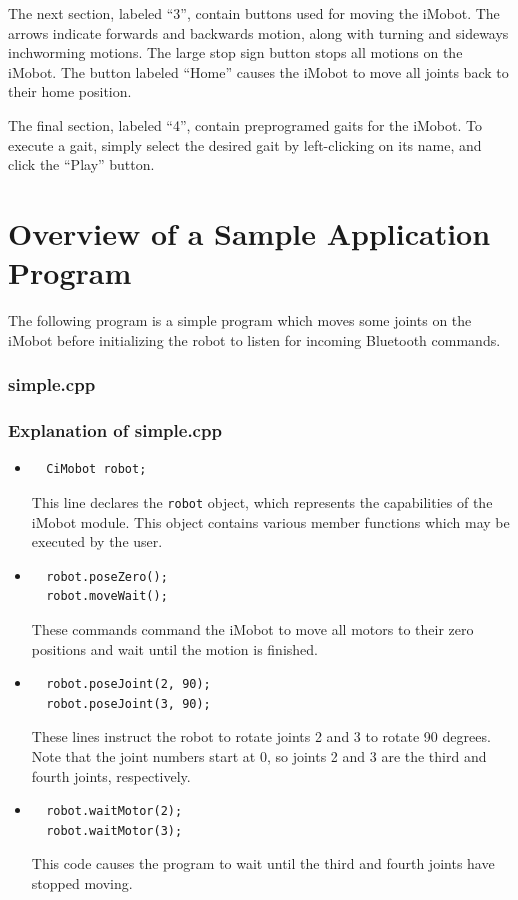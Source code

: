 \documentclass[11pt]{report}
\begin{document}
The next section, labeled ``3'', contain buttons used for moving the iMobot. 
The arrows indicate forwards and backwards motion, along with turning and
sideways inchworming motions. The large stop sign button stops all motions
on the iMobot. The button labeled ``Home'' causes the iMobot to move all joints
back to their home position. 

The final section, labeled ``4'', contain preprogramed gaits for the iMobot.
To execute a gait, simply select the desired gait by left-clicking on its name,
and click the ``Play'' button.

\chapter{Overview of a Sample Application Program}
The following program is a simple program which moves some joints on the iMobot
before initializing the robot to listen for incoming Bluetooth commands.
\subsection{simple.cpp \label{subsec:simple.cpp}}
\subsection{Explanation of simple.cpp}
\begin{itemize}
\item 
\begin{verbatim}
  CiMobot robot;
\end{verbatim}
This line declares the \texttt{robot} object, which represents the
capabilities of the iMobot module. This object contains various member
functions which may be executed by the user.
\item 
\begin{verbatim}
  robot.poseZero();
  robot.moveWait();
\end{verbatim}
These commands command the iMobot to move all motors to their zero positions
and wait until the motion is finished.
\item 
\begin{verbatim}
  robot.poseJoint(2, 90);
  robot.poseJoint(3, 90);
\end{verbatim}
These lines instruct the robot to rotate joints 2 and 3 to rotate 90
degrees. Note that the joint numbers start at 0, so joints 2 and 3 are the
third and fourth joints, respectively. 
\item 
\begin{verbatim}
  robot.waitMotor(2);
  robot.waitMotor(3);
\end{verbatim}
This code causes the program to wait until the third and fourth
joints have stopped moving.
\end{itemize}
\end{document}
